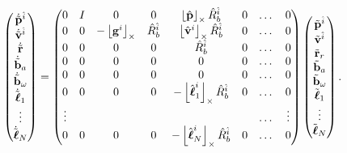 \[
\begin{pmatrix} 
	\dot{\tilde{\mathbf{p}}}^{\hat{i}} \\ 
	\dot{\tilde{\mathbf{v}}}^{\hat{i}} \\ 
	\dot{\tilde{\mathbf{r}}} \\ 
	\dot{\tilde{\mathbf{b}}}_a \\ 
	\dot{\tilde{\mathbf{b}}}_\omega \\  
	\dot{\tilde{\boldsymbol{\ell}}}_1 \\ 
	\vdots \\ 
	\dot{\tilde{\boldsymbol{\ell}}}_N 
\end{pmatrix}
    = \begin{pmatrix} 0 & I & 0 & 0 & \left\lfloor\hat{\mathbf{p}}\right\rfloor_{\times}\hat{R}_b^{\hat{i}} & 0 & \dots & 0 \\ 
                      0 & 0 & -\left\lfloor\mathbf{g}^i\right\rfloor_{\times} & \hat{R}_b^{\hat{i}} & \left\lfloor\hat{\mathbf{v}}^i\right\rfloor_{\times} \hat{R}_b^{\hat{i}} & 0 & \dots & 0 \\ 
                      0 & 0 & 0 & 0 & \hat{R}_b^{\hat{i}} & 0 & \dots & 0 \\ 
                      0 & 0 & 0 & 0 & 0 & 0 & \dots & 0 \\
                      0 & 0 & 0 & 0 & 0 & 0 & \dots & 0 \\
                      0 & 0 & 0 & 0 & -\left\lfloor\hat{\boldsymbol{\ell}}_1^i\right\rfloor_{\times}\hat{R}_b^{\hat{i}} & 0 & \dots & 0 \\
                      \vdots &  &  & & &  & \dots & \vdots \\ 
                      0 & 0 & 0 & 0 & -\left\lfloor\hat{\boldsymbol{\ell}}_N^i\right\rfloor_{\times}\hat{R}_b^{\hat{i}} & 0 & \dots & 0 
      \end{pmatrix}
      \begin{pmatrix} 
      	\tilde{\mathbf{p}}^{\hat{i}} \\ 
      	\tilde{\mathbf{v}}^{\hat{i}} \\ 
      	\tilde{\mathbf{r}}_r \\ 
      	\tilde{\mathbf{b}}_a \\ 
      	\tilde{\mathbf{b}}_\omega \\ 
      	\tilde{\boldsymbol{\ell}}_1 \\ 
      	\vdots \\ 
      	\tilde{\boldsymbol{\ell}}_N 
      \end{pmatrix}.
\]

